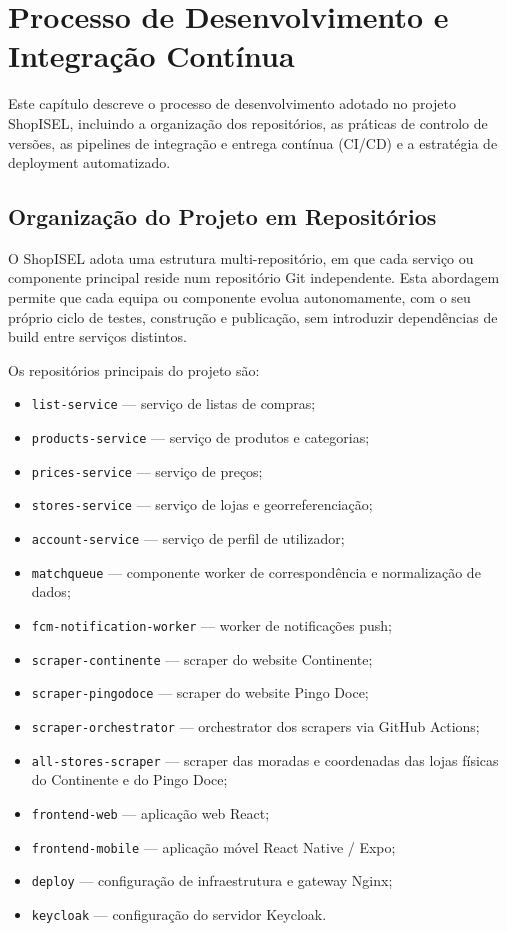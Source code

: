 
\chapter{Processo de Desenvolvimento e Integração Contínua}
\label{chap:5}

Este capítulo descreve o processo de desenvolvimento adotado no projeto ShopISEL, incluindo a organização dos repositórios, as práticas de controlo de versões, as pipelines de integração e entrega contínua (\ac{CI/CD}) e a estratégia de deployment automatizado.

\section{Organização do Projeto em Repositórios}
\label{sec:5.1}

O ShopISEL adota uma estrutura multi-repositório, em que cada serviço ou componente principal reside num repositório Git independente. Esta abordagem permite que cada equipa ou componente evolua autonomamente, com o seu próprio ciclo de testes, construção e publicação, sem introduzir dependências de build entre serviços distintos.

Os repositórios principais do projeto são:

\begin{itemize}
    \item \texttt{list-service} — serviço de listas de compras;
    \item \texttt{products-service} — serviço de produtos e categorias;
    \item \texttt{prices-service} — serviço de preços;
    \item \texttt{stores-service} — serviço de lojas e georreferenciação;
    \item \texttt{account-service} — serviço de perfil de utilizador;
    \item \texttt{matchqueue} — componente worker de correspondência e normalização de dados;
    \item \texttt{fcm-notification-worker} — worker de notificações push;
    \item \texttt{scraper-continente} — scraper do website Continente;
    \item \texttt{scraper-pingodoce} — scraper do website Pingo Doce;
    \item \texttt{scraper-orchestrator} — orchestrator dos scrapers via GitHub Actions;
    \item \texttt{all-stores-scraper} — scraper das moradas e coordenadas das lojas físicas do Continente e do Pingo Doce;
    \item \texttt{frontend-web} — aplicação web React;
    \item \texttt{frontend-mobile} — aplicação móvel React Native / Expo;
    \item \texttt{deploy} — configuração de infraestrutura e gateway Nginx;
    \item \texttt{keycloak} — configuração do servidor Keycloak.
\end{itemize}


